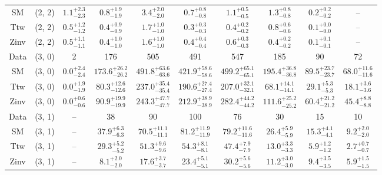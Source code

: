 \begin{table}[h!]
{\begin{tabular}{cccccccccc}
	SM & (2, 2) & $1.1^{+ 2.3 }_{- 2.3 }$ & $0.8^{+ 1.9 }_{- 1.9 }$ & $3.4^{+ 2.0 }_{- 2.0 }$ & $0.7^{+ 0.8 }_{- 0.8 }$ & $1.1^{+ 0.5 }_{- 0.5 }$ & $1.3^{+ 0.8 }_{- 0.8 }$ & $0.2^{+ 0.2 }_{- 0.2 }$ & -- \\[0.5ex] 
	Ttw & (2, 2) & $0.5^{+ 1.2 }_{- 1.2 }$ & $0.4^{+ 0.9 }_{- 0.9 }$ & $1.7^{+ 1.0 }_{- 1.0 }$ & $0.3^{+ 0.3 }_{- 0.3 }$ & $0.4^{+ 0.2 }_{- 0.2 }$ & $0.8^{+ 0.6 }_{- 0.6 }$ & $0.1^{+ 0.0 }_{- 0.0 }$ & -- \\[0.5ex] 
	Zinv & (2, 2) & $0.5^{+ 1.1 }_{- 1.1 }$ & $0.4^{+ 1.0 }_{- 1.0 }$ & $1.6^{+ 1.0 }_{- 1.0 }$ & $0.4^{+ 0.4 }_{- 0.4 }$ & $0.6^{+ 0.3 }_{- 0.3 }$ & $0.4^{+ 0.2 }_{- 0.2 }$ & $0.1^{+ 0.1 }_{- 0.1 }$ & -- \\[0.5ex] 
	Data & (3, 0) & 2 & 176 & 505 & 491 & 547 & 185 & 90 & 72 \\[0.5ex] 
	SM & (3, 0) & $0.0^{+ 2.4 }_{- 2.4 }$ & $173.6^{+ 26.2 }_{- 26.2 }$ & $491.8^{+ 63.6 }_{- 63.6 }$ & $421.9^{+ 58.6 }_{- 58.6 }$ & $499.2^{+ 65.1 }_{- 65.1 }$ & $195.4^{+ 36.8 }_{- 36.8 }$ & $89.5^{+ 23.7 }_{- 23.7 }$ & $68.0^{+ 11.6 }_{- 11.6 }$ \\[0.5ex] 
	Ttw & (3, 0) & $0.0^{+ 1.9 }_{- 1.9 }$ & $80.3^{+ 12.6 }_{- 12.6 }$ & $237.0^{+ 35.4 }_{- 35.4 }$ & $190.6^{+ 27.4 }_{- 27.4 }$ & $207.0^{+ 32.1 }_{- 32.1 }$ & $68.1^{+ 14.1 }_{- 14.1 }$ & $29.1^{+ 5.3 }_{- 5.3 }$ & $18.1^{+ 3.6 }_{- 3.6 }$ \\[0.5ex] 
	Zinv & (3, 0) & $0.0^{+ 0.6 }_{- 0.6 }$ & $90.9^{+ 19.9 }_{- 19.9 }$ & $243.3^{+ 47.7 }_{- 47.7 }$ & $212.9^{+ 38.9 }_{- 38.9 }$ & $282.4^{+ 44.2 }_{- 44.2 }$ & $111.6^{+ 25.2 }_{- 25.2 }$ & $60.4^{+ 21.2 }_{- 21.2 }$ & $45.4^{+ 8.8 }_{- 8.8 }$ \\[0.5ex] 
	Data & (3, 1) & -- & 38 & 90 & 100 & 76 & 30 & 15 & 10 \\[0.5ex] 
	SM & (3, 1) & -- & $37.9^{+ 6.3 }_{- 6.3 }$ & $70.5^{+ 11.1 }_{- 11.1 }$ & $81.2^{+ 11.9 }_{- 11.9 }$ & $79.2^{+ 11.6 }_{- 11.6 }$ & $26.4^{+ 5.9 }_{- 5.9 }$ & $15.3^{+ 4.1 }_{- 4.1 }$ & $9.2^{+ 2.0 }_{- 2.0 }$ \\[0.5ex] 
	Ttw & (3, 1) & -- & $29.3^{+ 5.2 }_{- 5.2 }$ & $51.3^{+ 9.6 }_{- 9.6 }$ & $54.3^{+ 8.1 }_{- 8.1 }$ & $47.4^{+ 7.9 }_{- 7.9 }$ & $13.0^{+ 3.3 }_{- 3.3 }$ & $5.9^{+ 1.2 }_{- 1.2 }$ & $2.7^{+ 0.7 }_{- 0.7 }$ \\[0.5ex] 
	Zinv & (3, 1) & -- & $8.1^{+ 2.0 }_{- 2.0 }$ & $17.6^{+ 3.7 }_{- 3.7 }$ & $23.4^{+ 5.1 }_{- 5.1 }$ & $30.2^{+ 5.6 }_{- 5.6 }$ & $11.2^{+ 3.0 }_{- 3.0 }$ & $9.4^{+ 3.5 }_{- 3.5 }$ & $5.9^{+ 1.5 }_{- 1.5 }$ \\[0.5ex] 

\end{tabular}}
\end{table}
